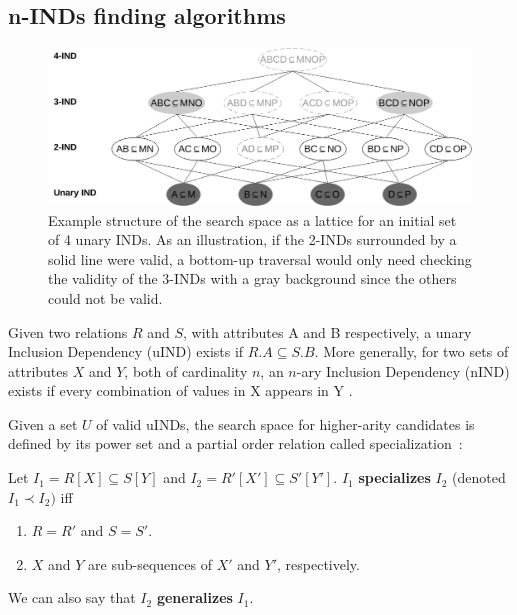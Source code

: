 \subsection{n-INDs finding algorithms}
\label{sec:nind_finding}
\begin{figure}[ht]
    \centering
    \includegraphics[width=\linewidth]{images/5_presq/lattice}
    \caption[Example structure of the search space as a lattice for an initial set
        of 4 unary .]{
        Example structure of the search space as a lattice for an initial set
        of 4 unary \glspl{IND}.
        As an illustration, if the 2-INDs surrounded by a solid line were valid,
        a bottom-up traversal would only need checking the validity of the 3-INDs with a 
        gray background since the others could not be valid.
    }
    \label{fig:lattice}
\end{figure}

Given two relations $R$ and $S$, with attributes A and B respectively,
a unary Inclusion Dependency (uIND) exists if $R.A \subseteq S.B$.
More generally, for two sets of attributes $X$ and $Y$, both of cardinality $n$, an
$n$-ary Inclusion Dependency (nIND) exists if every combination of values in X appears in Y
\cite{DeMarchi2002,abedjan2015}.

Given a set $U$ of valid uINDs, the search space for
higher-arity candidates is defined by its power set and a partial order relation
called specialization~\cite{DeMarchi2002}:

\begin{definition}
    \label{def:specialization}
    Let $I_1 = R[X] \subseteq S[Y]$ and
    $I_2 = R'[X'] \subseteq S'[Y']$. $I_1$ \textbf{specializes} $I_2$ (denoted $I_1 \prec I_2)$ iff
    
    \begin{enumerate}
        \item $R = R'$ and $S = S'$.
        \item $X$ and $Y$ are sub-sequences of $X'$ and $Y'$, respectively.
    \end{enumerate}
    
    We can also say that $I_2$ \textbf{generalizes} $I_1$.
\end{definition}

